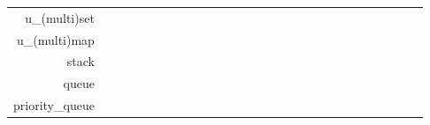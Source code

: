 \begin{frame}[fragile]
{\begin{tabular}{|r|lllll|llll|llllll|lllllllll|ll|}
        u\_(multi)set & \cellcolor{red} & \cellcolor{red} & \cellcolor{red} & \cellcolor{red} & \cellcolor{red} & \cellcolor{green} & \cellcolor{green} & \cellcolor{red} & \cellcolor{red} & \cellcolor{green} & \cellcolor{green} & \cellcolor{green} & \cellcolor{red} & \cellcolor{red} & \cellcolor{red} & \cellcolor{green} & \cellcolor{green} & \cellcolor{green} & \cellcolor{green} & \cellcolor{red} & \cellcolor{red} & \cellcolor{red} & \cellcolor{red} & \cellcolor{green} & \cellcolor{green} & \cellcolor{red} \\
        u\_(multi)map & \cellcolor{red} & \cellcolor{red} & \cellcolor{red} & \cellcolor{red} & \cellcolor{red} & \cellcolor{green} & \cellcolor{green} & \cellcolor{red} & \cellcolor{red} & \cellcolor{green} & \cellcolor{green} & \cellcolor{green} & \cellcolor{red} & \cellcolor{red} & \cellcolor{red} & \cellcolor{green} & \cellcolor{green} & \cellcolor{green} & \cellcolor{green} & \cellcolor{red} & \cellcolor{red} & \cellcolor{red} & \cellcolor{red} & \cellcolor{green} & \cellcolor{green} & \cellcolor{red} \\
        \hline
        stack & \cellcolor{red} & \cellcolor{red} & \cellcolor{green} & \cellcolor{red} & \cellcolor{red} & \cellcolor{red} & \cellcolor{red} & \cellcolor{red} & \cellcolor{red} & \cellcolor{green} & \cellcolor{green} & \cellcolor{red} & \cellcolor{red} & \cellcolor{red} & \cellcolor{red} & \cellcolor{red} & \cellcolor{red} & \cellcolor{green} & \cellcolor{red} & \cellcolor{green} & \cellcolor{red} & \cellcolor{red} & \cellcolor{red} & \cellcolor{green} & \cellcolor{green} & \cellcolor{green} \\
        queue & \cellcolor{red} & \cellcolor{red} & \cellcolor{green} & \cellcolor{green} & \cellcolor{red} & \cellcolor{red} & \cellcolor{red} & \cellcolor{red} & \cellcolor{red} & \cellcolor{green} & \cellcolor{green} & \cellcolor{red} & \cellcolor{red} & \cellcolor{red} & \cellcolor{red} & \cellcolor{red} & \cellcolor{red} & \cellcolor{green} & \cellcolor{red} & \cellcolor{green} & \cellcolor{red} & \cellcolor{red} & \cellcolor{red} & \cellcolor{green} & \cellcolor{green} & \cellcolor{green} \\
        priority\_queue & \cellcolor{red} & \cellcolor{red} & \cellcolor{green} & \cellcolor{green} & \cellcolor{red} & \cellcolor{red} & \cellcolor{red} & \cellcolor{red} & \cellcolor{red} & \cellcolor{green} & \cellcolor{green} & \cellcolor{red} & \cellcolor{red} & \cellcolor{red} & \cellcolor{red} & \cellcolor{red} & \cellcolor{red} & \cellcolor{green} & \cellcolor{red} & \cellcolor{green} & \cellcolor{red} & \cellcolor{red} & \cellcolor{red} & \cellcolor{green} & \cellcolor{red} & \cellcolor{red} \\
        \hline
    \end{tabular}}
\end{frame}

